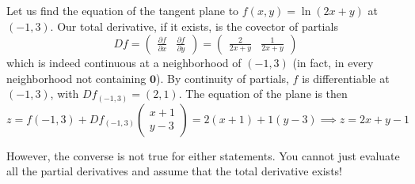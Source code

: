   \begin{example}
    Let us find the equation of the tangent plane to $f(x, y) = \ln(2x + y)$ at $(-1, 3)$. Our total derivative, if it exists, is the covector of partials
    \begin{equation}
      D f = \begin{pmatrix} \frac{\partial f}{\partial x} & \frac{\partial f}{\partial y} \end{pmatrix} = \begin{pmatrix} \frac{2}{2x + y} & \frac{1}{2x + y} \end{pmatrix}
    \end{equation}
    which is indeed continuous at a neighborhood of $(-1, 3)$ (in fact, in every neighborhood not containing $\mathbf{0}$). By continuity of partials, $f$ is differentiable at $(-1, 3)$, with $D f_{(-1, 3)} = (2, 1)$. The equation of the plane is then 
    \begin{equation}
      z = f(-1, 3) + D f_{(-1, 3)} \begin{pmatrix} x + 1\\ y - 3 \end{pmatrix} = 2(x + 1) + 1 (y - 3) \implies z = 2x + y - 1
    \end{equation}
  \end{example}

  However, the converse is not true for either statements. You cannot just evaluate all the partial derivatives and assume that the total derivative exists! 

